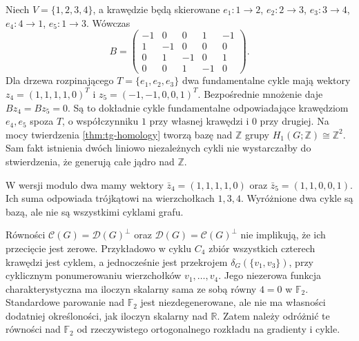 \begin{przyklad}
Niech $V=\{1,2,3,4\}$, a krawędzie będą skierowane
$e_1:1\to2$, $e_2:2\to3$, $e_3:3\to4$,
$e_4:4\to1$, $e_5:1\to3$. Wówczas
\[
B=\begin{pmatrix}
-1&0&0&1&-1\\1&-1&0&0&0\\
0&1&-1&0&1\\0&0&1&-1&0
\end{pmatrix}.
\]
Dla drzewa rozpinającego $T=\{e_1,e_2,e_3\}$
dwa fundamentalne cykle mają wektory
$z_4=(1,1,1,1,0)^T$ i $z_5=(-1,-1,0,0,1)^T$.
Bezpośrednie mnożenie daje $Bz_4=Bz_5=0$.
Są to dokładnie cykle fundamentalne odpowiadające krawędziom
$e_4,e_5$ spoza $T$, o współczynniku $1$ przy własnej krawędzi
i $0$ przy drugiej. Na mocy twierdzenia \ref{thm:tg-homology}
tworzą bazę nad $\mathbb Z$ grupy $H_1(G;\mathbb Z)\cong\mathbb Z^2$.
Sam fakt istnienia dwóch liniowo niezależnych cykli nie
wystarczałby do stwierdzenia, że generują całe jądro nad $\mathbb Z$.

W wersji modulo dwa mamy wektory
$\bar z_4=(1,1,1,1,0)$ oraz $\bar z_5=(1,1,0,0,1)$.
Ich suma odpowiada trójkątowi na wierzchołkach $1,3,4$.
Wyróżnione dwa cykle są bazą, ale nie są wszystkimi
cyklami grafu.
\end{przyklad}

\begin{center}
\end{center}

\begin{uwaga}
Równości $\mathcal C(G)=\mathcal D(G)^\perp$ oraz
$\mathcal D(G)=\mathcal C(G)^\perp$ nie implikują,
że ich przecięcie jest zerowe. Przykładowo w cyklu
$C_4$ zbiór wszystkich czterech krawędzi jest cyklem,
a jednocześnie jest przekrojem $\delta_G(\{v_1,v_3\})$,
przy cyklicznym ponumerowaniu wierzchołków $v_1,\ldots,v_4$.
Jego niezerowa funkcja charakterystyczna ma iloczyn
skalarny sama ze sobą równy $4=0$ w $\mathbb F_2$.
Standardowe parowanie nad $\mathbb F_2$ jest niezdegenerowane,
ale nie ma własności dodatniej określoności, jak iloczyn
skalarny nad $\mathbb R$. Zatem należy odróżnić te równości nad $\mathbb F_2$
od rzeczywistego ortogonalnego rozkładu na gradienty i cykle.
\end{uwaga}

